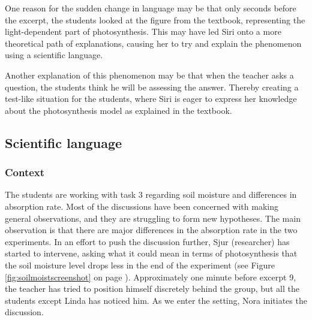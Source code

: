 One reason for the sudden change in language may be that only seconds before the excerpt, the students looked at the figure from the textbook, representing the light-dependent part of photosynthesis. This may have led Siri onto a more theoretical path of explanations, causing her to try and explain the phenomenon using a scientific language. 

Another explanation of this phenomenon may be that when the teacher asks a question, the students think he will be assessing the answer. Thereby creating a test-like situation for the students, where Siri is eager to express her knowledge about the photosynthesis model as explained in the textbook. 

\subsection{Scientific language}
\subsubsection*{Context}
The students are working with task 3 regarding soil moisture and differences in absorption rate. Most of the discussions have been concerned with making general observations, and they are struggling to form new hypotheses. The main observation is that there are major differences in the absorption rate in the two experiments. In an effort to push the discussion further, Sjur (researcher) has started to intervene, asking what it could mean in terms of photosynthesis that the soil moisture level drops less in the end of the experiment (see Figure \ref{fig:soilmoistscreenshot} on page \pageref{fig:soilmoistscreenshot}). Approximately one minute before excerpt 9, the teacher has tried to position himself discretely behind the group, but all the students except Linda has noticed him. As we enter the setting, Nora initiates the discussion.

